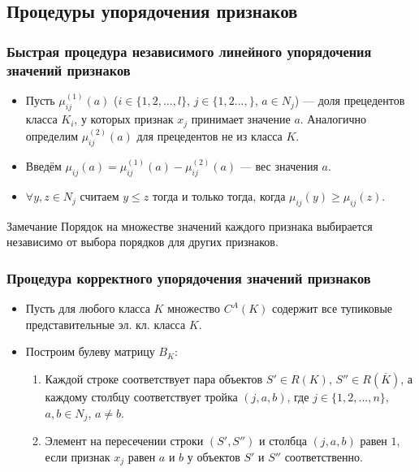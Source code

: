 \documentclass[
	11pt,
]{beamer}
\begin{document}
\subsection{Процедуры упорядочения признаков}

\begin{frame}
	\frametitle{Быстрая процедура независимого линейного упорядочения значений признаков}

	\begin{itemize}
		\item Пусть $\mu^{(1)}_{ij}(a)$ ($i \in \{1, 2, ..., l\}$, $j \in \{1,2 ..., \}$, $a \in N_j$) — доля прецедентов класса $K_i$, у которых признак $x_j$ принимает значение $a$. Аналогично определим $\mu^{(2)}_{ij}(a)$ для прецедентов не из класса $K$.
		\item Введём $\mu_{ij}(a) = \mu^{(1)}_{ij}(a) - \mu^{(2)}_{ij}(a)$ — вес значения $a$.
		\item $\forall y, z \in N_j$ считаем $y \leq z$ тогда и только тогда, когда $\mu_{ij}(y) \geq \mu_{ij}(z)$.
	\end{itemize}


	\begin{exampleblock}{Замечание}
		Порядок на множестве значений каждого признака выбирается независимо от выбора порядков для других признаков.
	\end{exampleblock}
\end{frame}

\begin{frame}
	\frametitle{Процедура корректного упорядочения значений признаков}

	\begin{itemize}
		\item Пусть для любого класса $K$ множество $C^A(K)$ содержит все тупиковые представительные эл. кл. класса $K$.
		\item Построим булеву матрицу $B_K$:
			\begin{enumerate}
				\item Каждой строке соответствует пара объектов $S' \in R(K)$, $S'' \in R(\overline{K})$, а каждому столбцу соответствует тройка $(j, a, b)$, где $j \in \{1, 2, ..., n\}$, $a, b \in N_j$, $a \neq b$.
				\item Элемент на пересечении строки $(S', S'')$ и столбца $(j, a, b)$ равен $1$, если признак $x_j$ равен $a$ и $b$ у объектов $S'$ и $S''$ соответственно.
			\end{enumerate}
	\end{itemize}
\end{frame}
\end{document}
